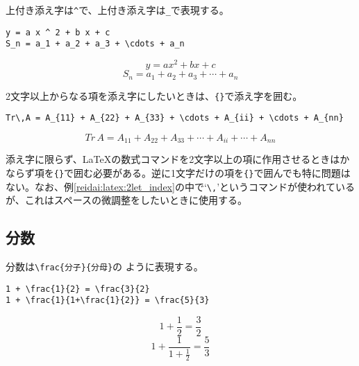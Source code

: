 上付き添え字は\texttt{\^}で、上付き添え字は\texttt{\_}で表現する。
\begin{reidai}
    \begin{verbatim}
y = a x ^ 2 + b x + c
S_n = a_1 + a_2 + a_3 + \cdots + a_n
\end{verbatim}
\end{reidai}
\vspace*{-1.5em}
\begin{kekka}
    \begin{equation*}
        y = a x ^ 2 + b x + c
    \end{equation*}
    \begin{equation*}
        S_n = a_1 + a_2 + a_3 + \cdots + a_n
    \end{equation*}
    \vspace{0pt}
\end{kekka} \noindent
2文字以上からなる項を添え字にしたいときは、\verb|{}|で添え字を囲む。
\begin{reidai}
    \label{reidai:latex:2let_index}
    \begin{verbatim}
Tr\,A = A_{11} + A_{22} + A_{33} + \cdots + A_{ii} + \cdots + A_{nn}
\end{verbatim}
\end{reidai}
\vspace*{-1.5em}
\begin{kekka}
    \begin{equation*}
        Tr\,A = A_{11} + A_{22} + A_{33} + \cdots + A_{ii} + \cdots + A_{nn}
    \end{equation*}
    \vspace{0pt}
\end{kekka} \noindent
添え字に限らず、\LaTeX の数式コマンドを2文字以上の項に作用させるときはかならず項を\verb|{}|で囲む必要がある。逆に1文字だけの項を\verb|{}|で囲んでも特に問題はない。なお、例\ref{reidai:latex:2let_index}の中で`\verb|\,|'というコマンドが使われているが、これはスペースの微調整をしたいときに使用する。

\subsection{分数}
\label{sec:latex:frac}

分数は\texttt{\textbackslash frac\{\textrm{分子}\}\{\textrm{分母}\}}の
ように表現する。
\begin{reidai}
    \begin{verbatim}
1 + \frac{1}{2} = \frac{3}{2}
1 + \frac{1}{1+\frac{1}{2}} = \frac{5}{3}
\end{verbatim}
\end{reidai}
\vspace*{-1.5em}
\begin{kekka}
    \begin{equation*}
        1 + \frac{1}{2} = \frac{3}{2}
    \end{equation*}
    \begin{equation*}
        1 + \frac{1}{1+\frac{1}{2}} = \frac{5}{3}
    \end{equation*}
\end{kekka}

